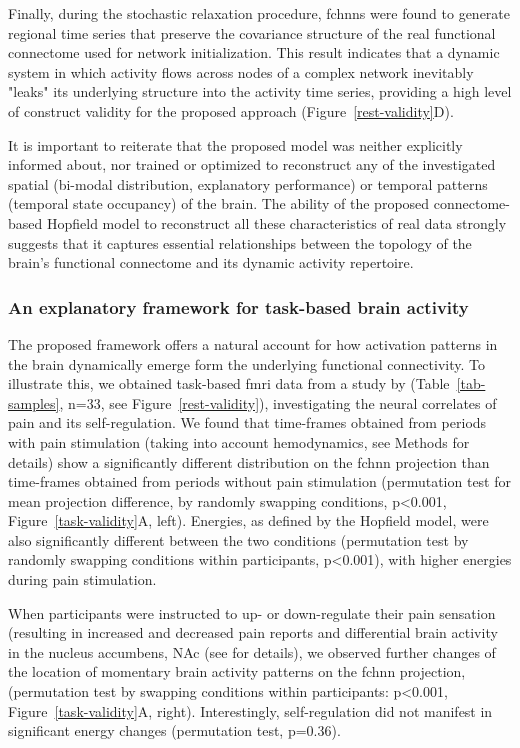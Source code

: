 \documentclass{article}
\begin{document}
Finally, during the stochastic relaxation procedure, \acrshort{fchnn}s were found to generate regional time series that
preserve the covariance structure of the real functional connectome used for network initialization. This result indicates that a dynamic system in which activity flows across nodes of a complex network inevitably
"leaks" its underlying structure into the activity time series, providing a high level of construct validity for the proposed approach (Figure~\ref{rest-validity}D).

It is important to reiterate that the proposed model was neither explicitly informed about, nor trained or optimized to reconstruct any of the investigated spatial (bi-modal distribution, explanatory performance) or temporal patterns (temporal state occupancy) of the brain.
The ability of the proposed connectome-based Hopfield model to reconstruct all these characteristics of real data strongly suggests that it captures essential relationships between the topology of the brain's functional connectome and its dynamic activity repertoire.

\subsubsection{An explanatory framework for task-based brain activity}\label{An explanatory framework for task-based brain activity}

The proposed framework offers a natural account for how activation patterns in the brain dynamically emerge form the underlying functional connectivity. To illustrate this, we obtained task-based \acrshort{fmri} data from a study by
\citet{woo2015distinct} (Table~\ref{tab-samples}, n=33, see Figure~\ref{rest-validity}), investigating the neural
correlates of pain and its self-regulation.
We found that time-frames obtained from periods with pain stimulation (taking into account hemodynamics, see Methods for details) show a significantly different distribution on the \acrshort{fchnn} projection than time-frames obtained from periods without pain stimulation (permutation test for mean projection difference, by randomly swapping conditions, p\textless 0.001, Figure~\ref{task-validity}A, left). Energies, as defined by the Hopfield model, were also significantly different between the two conditions (permutation test by randomly swapping conditions within participants, p\textless 0.001), with higher energies during pain stimulation.

When participants were instructed to up- or down-regulate their pain sensation (resulting in increased and decreased pain reports and differential brain activity in the nucleus accumbens, NAc (see \cite{woo2015distinct} for details), we observed further changes of the location of momentary brain activity patterns on the \acrshort{fchnn} projection, (permutation test by swapping conditions within participants: p\textless 0.001, Figure~\ref{task-validity}A, right). Interestingly, self-regulation did not manifest in significant energy changes (permutation test, p=0.36).
\end{document}
